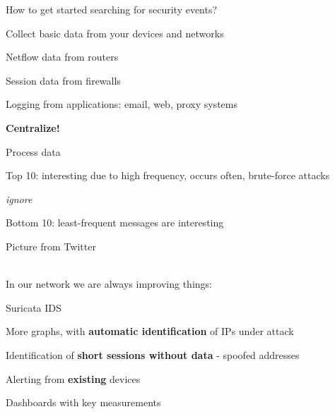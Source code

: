 \documentclass[Screen16to9,17pt]{foils}
\begin{document}

\begin{list1}
\item How to get started searching for security events?
\item Collect basic data from your devices and networks
\begin{list2}
\item Netflow data from routers
\item Session data from firewalls
\item Logging from applications: email, web, proxy systems
\end{list2}
\item {\bf Centralize!}
\item Process data
\begin{list2}
\item Top 10: interesting due to high frequency, occurs often, brute-force attacks
\item {\it ignore}
\item Bottom 10: least-frequent messages are interesting
\end{list2}
\end{list1}








Picture from Twitter\\
\\





In our network we are always improving things:
\begin{list1}
\item Suricata IDS 
\item More graphs, with {\bf automatic identification} of IPs under attack
\item Identification of {\bf short sessions without data} - spoofed addresses
\item Alerting from {\bf existing} devices
\item Dashboards with key measurements
\end{list1}
\end{document}
